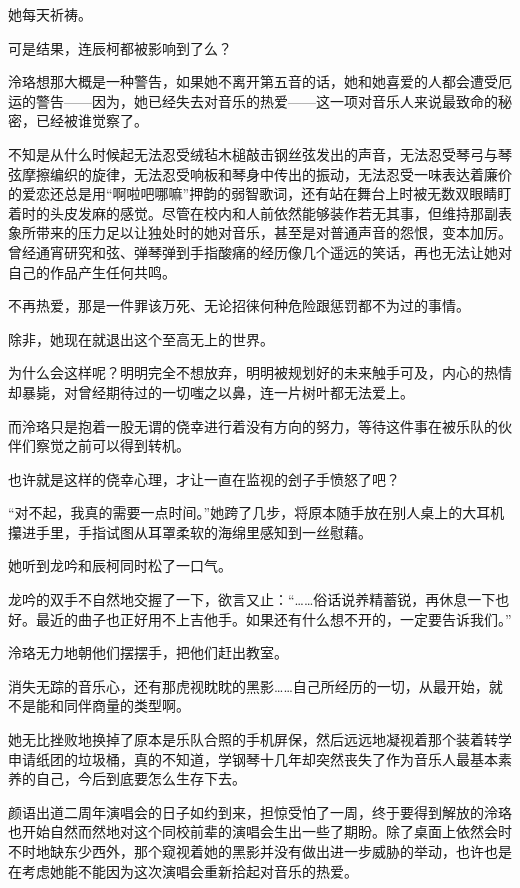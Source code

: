 \documentclass[UTF8, scheme = chinese, openany]{ctexbook}
\begin{document}
她每天祈祷。

可是结果，连辰柯都被影响到了么？

泠珞想那大概是一种警告，如果她不离开第五音的话，她和她喜爱的人都会遭受厄运的警告——因为，她已经失去对音乐的热爱——这一项对音乐人来说最致命的秘密，已经被谁觉察了。

不知是从什么时候起无法忍受绒毡木槌敲击钢丝弦发出的声音，无法忍受琴弓与琴弦摩擦编织的旋律，无法忍受响板和琴身中传出的振动，无法忍受一味表达着廉价的爱恋还总是用“啊啦吧哪嘛”押韵的弱智歌词，还有站在舞台上时被无数双眼睛盯着时的头皮发麻的感觉。尽管在校内和人前依然能够装作若无其事，但维持那副表象所带来的压力足以让独处时的她对音乐，甚至是对普通声音的怨恨，变本加厉。曾经通宵研究和弦、弹琴弹到手指酸痛的经历像几个遥远的笑话，再也无法让她对自己的作品产生任何共鸣。

不再热爱，那是一件罪该万死、无论招徕何种危险跟惩罚都不为过的事情。

除非，她现在就退出这个至高无上的世界。

为什么会这样呢？明明完全不想放弃，明明被规划好的未来触手可及，内心的热情却暴毙，对曾经期待过的一切嗤之以鼻，连一片树叶都无法爱上。

而泠珞只是抱着一股无谓的侥幸进行着没有方向的努力，等待这件事在被乐队的伙伴们察觉之前可以得到转机。

也许就是这样的侥幸心理，才让一直在监视的刽子手愤怒了吧？

“对不起，我真的需要一点时间。”她跨了几步，将原本随手放在别人桌上的大耳机攥进手里，手指试图从耳罩柔软的海绵里感知到一丝慰藉。

她听到龙吟和辰柯同时松了一口气。

龙吟的双手不自然地交握了一下，欲言又止：“……俗话说养精蓄锐，再休息一下也好。最近的曲子也正好用不上吉他手。如果还有什么想不开的，一定要告诉我们。”

泠珞无力地朝他们摆摆手，把他们赶出教室。

消失无踪的音乐心，还有那虎视眈眈的黑影……自己所经历的一切，从最开始，就不是能和同伴商量的类型啊。

她无比挫败地换掉了原本是乐队合照的手机屏保，然后远远地凝视着那个装着转学申请纸团的垃圾桶，真的不知道，学钢琴十几年却突然丧失了作为音乐人最基本素养的自己，今后到底要怎么生存下去。

颜语出道二周年演唱会的日子如约到来，担惊受怕了一周，终于要得到解放的泠珞也开始自然而然地对这个同校前辈的演唱会生出一些了期盼。除了桌面上依然会时不时地缺东少西外，那个窥视着她的黑影并没有做出进一步威胁的举动，也许也是在考虑她能不能因为这次演唱会重新拾起对音乐的热爱。
\end{document}
